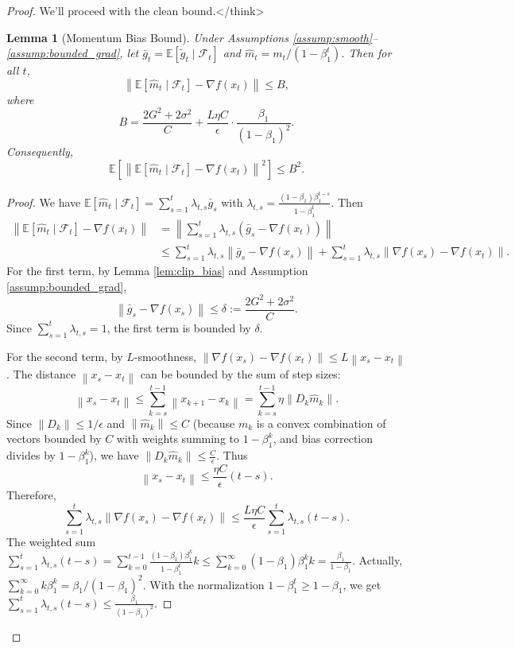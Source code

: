 \documentclass{article}
\newtheorem{lemma}{Lemma}
\newcommand{\E}{\mathbb{E}}
\newcommand{\norm}[1]{\left\| #1 \right\|}
\begin{document}
\begin{proof}
    We'll proceed with the clean bound.</think>
\begin{lemma}[Momentum Bias Bound] \label{lem:momentum_bias}
    Under Assumptions \ref{assump:smooth}--\ref{assump:bounded_grad}, let $\bar{g}_t = \E[\tilde{g}_t \mid \mathcal{F}_t]$ and $\hat{m}_t = m_t/(1-\beta_1^t)$. Then for all $t$,
    \[
        \norm{\E[\hat{m}_t \mid \mathcal{F}_t] - \nabla f(x_t)} \le B,
    \]
    where
    \[
        B = \frac{2G^2+2\sigma^2}{C} + \frac{L \eta C}{\epsilon} \cdot \frac{\beta_1}{(1-\beta_1)^2}.
    \]
    Consequently,
    \[
        \E\left[ \norm{\E[\hat{m}_t \mid \mathcal{F}_t] - \nabla f(x_t)}^2 \right] \le B^2.
    \]
\end{lemma}
\begin{proof}
    We have $\E[\hat{m}_t \mid \mathcal{F}_t] = \sum_{s=1}^t \lambda_{t,s} \bar{g}_s$ with $\lambda_{t,s} = \frac{(1-\beta_1)\beta_1^{t-s}}{1-\beta_1^t}$. Then
    \begin{align*}
        \norm{\E[\hat{m}_t \mid \mathcal{F}_t] - \nabla f(x_t)}
        &= \norm{\sum_{s=1}^t \lambda_{t,s} (\bar{g}_s - \nabla f(x_t))} \\
        &\le \sum_{s=1}^t \lambda_{t,s} \norm{\bar{g}_s - \nabla f(x_s)} + \sum_{s=1}^t \lambda_{t,s} \norm{\nabla f(x_s) - \nabla f(x_t)}.
    \end{align*}
    For the first term, by Lemma \ref{lem:clip_bias} and Assumption \ref{assump:bounded_grad},
    \[
        \norm{\bar{g}_s - \nabla f(x_s)} \le \delta := \frac{2G^2 + 2\sigma^2}{C}.
    \]
    Since $\sum_{s=1}^t \lambda_{t,s} = 1$, the first term is bounded by $\delta$.

    For the second term, by $L$-smoothness, $\norm{\nabla f(x_s) - \nabla f(x_t)} \le L \norm{x_s - x_t}$. The distance $\norm{x_s - x_t}$ can be bounded by the sum of step sizes:
    \[
        \norm{x_s - x_t} \le \sum_{k=s}^{t-1} \norm{x_{k+1} - x_k} = \sum_{k=s}^{t-1} \eta \norm{D_k \hat{m}_k}.
    \]
    Since $\norm{D_k} \le 1/\epsilon$ and $\norm{\hat{m}_k} \le C$ (because $m_k$ is a convex combination of vectors bounded by $C$ with weights summing to $1-\beta_1^k$, and bias correction divides by $1-\beta_1^k$), we have $\norm{D_k \hat{m}_k} \le \frac{C}{\epsilon}$. Thus
    \[
        \norm{x_s - x_t} \le \frac{\eta C}{\epsilon} (t-s).
    \]
    Therefore,
    \[
        \sum_{s=1}^t \lambda_{t,s} \norm{\nabla f(x_s) - \nabla f(x_t)} \le \frac{L \eta C}{\epsilon} \sum_{s=1}^t \lambda_{t,s} (t-s).
    \]
    The weighted sum $\sum_{s=1}^t \lambda_{t,s} (t-s) = \sum_{k=0}^{t-1} \frac{(1-\beta_1)\beta_1^k}{1-\beta_1^t} k \le \sum_{k=0}^\infty (1-\beta_1)\beta_1^k k = \frac{\beta_1}{1-\beta_1}$.
    Actually, $\sum_{k=0}^\infty k \beta_1^k = \beta_1/(1-\beta_1)^2$. With the normalization $1-\beta_1^t \ge 1-\beta_1$, we get $\sum_{s=1}^t \lambda_{t,s} (t-s) \le \frac{\beta_1}{(1-\beta_1)^2}$.


\end{proof}
\end{proof}
\end{document}
